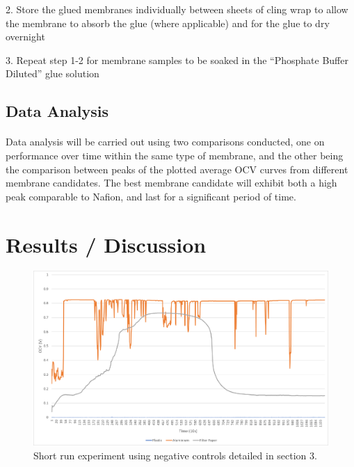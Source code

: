 \documentclass[12pt, twocolumn, a4paper]{article}
\begin{document}
        2. Store the glued membranes individually between sheets of cling wrap to allow the membrane to absorb the glue (where applicable) and for the glue to dry overnight
        
        3. Repeat step 1-2 for membrane samples to be soaked in the “Phosphate Buffer Diluted” glue solution

    \subsection{Data Analysis}
        \paragraph{}Data analysis will be carried out using two comparisons conducted, one on performance over time within the same type of membrane, and the other being the comparison between peaks of the plotted average OCV curves from different membrane candidates. The best membrane candidate will exhibit both a high peak comparable to Nafion\texttrademark{}, and last for a significant period of time.
    
\section{Results / Discussion}
    \begin{figure}
        \centering
        \includegraphics[scale=0.25]{negative controls.png}
        \caption{Short run experiment using negative controls detailed in section 3.}
        \label{fig:averages}
    \end{figure}
\end{document}

